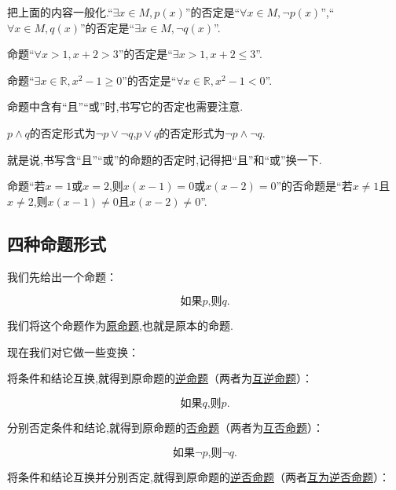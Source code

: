 \documentclass[lang=cn,math=cm,chinesefont=nofont,11pt,scheme=chinese,twocol]{elegantbook}
\begin{document}
把上面的内容一般化.“$\exists x\in M, p(x)$”的否定是“$\forall x{\in}M,\neg p(x)$”,“$\forall x\in M, q(x)$”的否定是“$\exists x{\in}M, \neg q(x)$”.

\begin{example}
  命题“$\forall x>1,x+2>3$”的否定是“$\exists x>1,x+2\leqslant 3$”.
\end{example}

\begin{example}
  命题“$\exists x\in\mathbb{R},x^2-1\geqslant 0$”的否定是“$\forall x\in\mathbb{R},x^2-1<0$”.
\end{example}

命题中含有“且”“或”时,书写它的否定也需要注意.

$p\land q$的否定形式为$\lnot p\lor \lnot q$,$p\lor q$的否定形式为$\lnot p\land \lnot q$.

就是说,书写含“且”“或”的命题的否定时,记得把“且”和“或”换一下.

\begin{example}
  命题“若$x=1$或$x=2$,则$x(x-1)=0$或$x(x-2)=0$”的否命题是“若$x\neq 1$且$x\neq 2$,则$x(x-1)\neq 0$且$x(x-2)\neq 0$”.
\end{example}

\subsection{四种命题形式}

我们先给出一个命题：

\begin{equation}\label{YuanMingTi}
  \text{如果}p\text{,则}q.
\end{equation}

我们将这个命题作为\underline{原命题},也就是原本的命题.

现在我们对它做一些变换：

将条件和结论互换,就得到原命题的\underline{逆命题}（两者为\underline{互逆命题}）：

\begin{equation}\label{NiMingTi}
  \text{如果}q\text{,则}p.
\end{equation}

分别否定条件和结论,就得到原命题的\underline{否命题}（两者为\underline{互否命题}）：

\begin{equation}\label{FouMingTi}
  \text{如果}\neg p\text{,则}\neg q.
\end{equation}

将条件和结论互换并分别否定,就得到原命题的\underline{逆否命题}（两者\underline{互为逆否命题}）：
\end{document}
